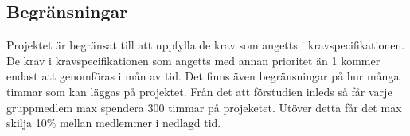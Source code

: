 \subsection{Begränsningar}

Projektet är begränsat till att uppfylla de krav som angetts i kravspecifikationen. De krav i kravspecifikationen som angetts med annan prioritet än 1 kommer endast att genomföras i mån av tid. Det finns även begränsningar på hur många timmar som kan läggas på projektet. Från det att förstudien inleds så får varje gruppmedlem max spendera 300 timmar på projeketet. Utöver detta får det max skilja 10\% mellan medlemmer i nedlagd tid.